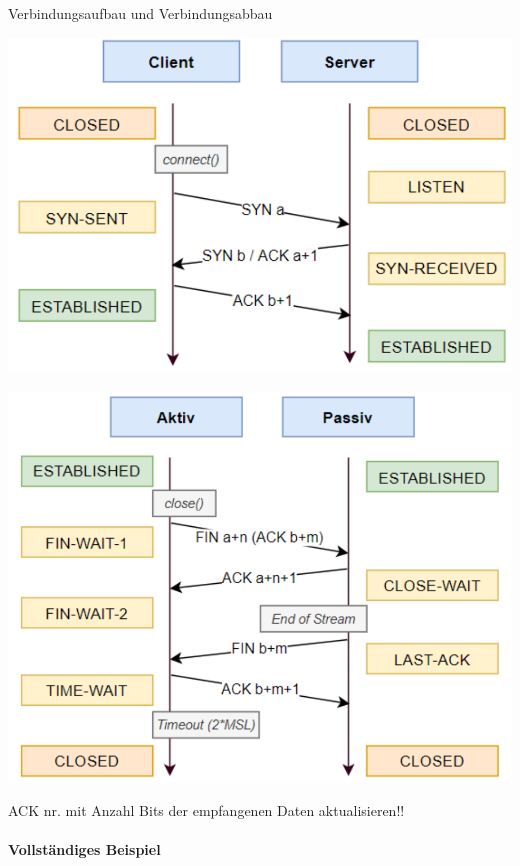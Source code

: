 \begin{KR}{Verbindungsaufbau und Verbindungsabbau}\\
\begin{minipage}{0.49\linewidth}
        \includegraphics[width=1\linewidth]{images/verbindungsaufbau.png}
\end{minipage}
\begin{minipage}{0.5\linewidth}
        \includegraphics[width=1\linewidth]{images/Verbindungsabbau.png}
\end{minipage}

{\small ACK nr. mit Anzahl Bits der empfangenen Daten aktualisieren!!}
\end{KR}

\paragraph*{Vollständiges Beispiel}

